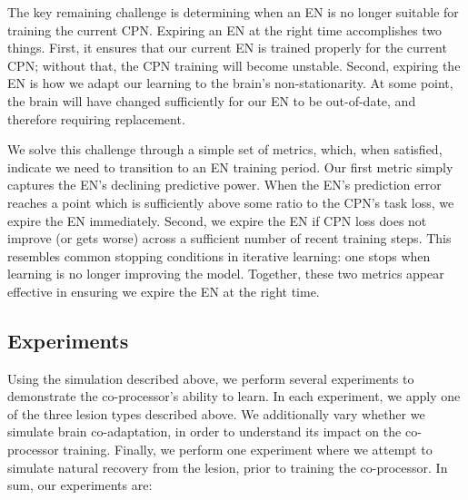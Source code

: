 \documentclass[12pt]{iopart}
\begin{document}
The key remaining challenge is determining when an EN is no longer suitable for training the
current CPN. Expiring an EN at the right time accomplishes two things. First, it ensures
that our current EN is trained properly for the current CPN; without that, the CPN training
will become unstable. Second, expiring the EN is how we adapt our learning to the brain's
non-stationarity. At some point, the brain will have changed sufficiently for our EN to be
out-of-date, and therefore requiring replacement.

We solve this challenge through a simple set of metrics, which, when satisfied, indicate
we need to transition to an EN training period. Our first metric simply captures the EN's
declining predictive power. When the EN's prediction error reaches a point which is
sufficiently above some ratio to the CPN's task loss, we expire the EN immediately.
Second, we expire the EN if CPN loss does not improve (or gets worse) across a sufficient
number of recent training steps. This resembles common stopping conditions in
iterative learning: one stops when learning is no longer improving the model. Together,
these two metrics appear effective in ensuring we expire the EN at the right time.

\subsection{Experiments}
\label{sec:experiments}

Using the simulation described above, we perform several experiments to
demonstrate the co-processor's ability to learn. In each experiment, we apply one
of the three lesion types described above. We additionally vary whether we simulate
brain co-adaptation, in order to understand its impact on the co-processor training.
Finally, we perform one experiment where we attempt to simulate natural recovery from
the lesion, prior to training the co-processor. In sum, our experiments are: \\
\end{document}
